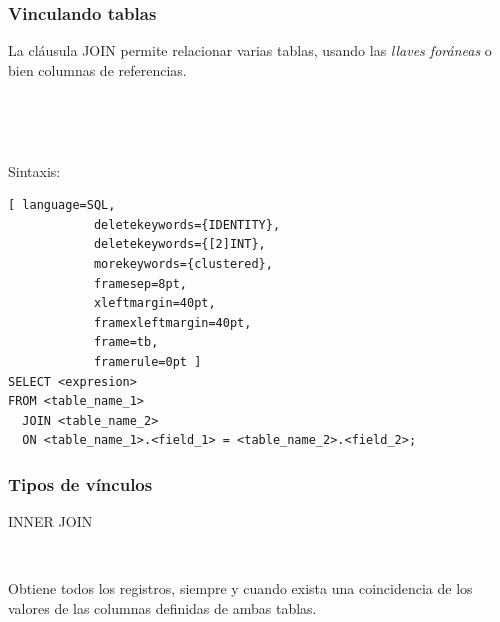 \documentclass[
	10pt, %
	aspectratio=169, %
]{beamer}
\begin{document}

\begin{frame}[fragile]
	
		\frametitle{Vinculando tablas}
		
		La cláusula \textcolor{codepurple}{JOIN} permite relacionar varias tablas, usando las \emph{llaves foráneas} o bien columnas de referencias.
		
		\ 
		
		\ 
		
		\pause
		
		Sintaxis: 
		\begin{lstlisting}[ language=SQL,
			deletekeywords={IDENTITY},
			deletekeywords={[2]INT},
			morekeywords={clustered},
			framesep=8pt,
			xleftmargin=40pt,
			framexleftmargin=40pt,
			frame=tb,
			framerule=0pt ]
SELECT <expresion>
FROM <table_name_1>
  JOIN <table_name_2>
  ON <table_name_1>.<field_1> = <table_name_2>.<field_2>;
\end{lstlisting}
		
\end{frame}


\begin{frame}[fragile]
	
	\frametitle{Tipos de vínculos}
	
	\begin{center}
		
		\textcolor{codepurple}{INNER JOIN}
		
		\ 
		
		Obtiene todos los registros, siempre y cuando exista una coincidencia de los valores de las columnas definidas de ambas tablas.
		
		\begin{venndiagram2sets}[
			labelA={ }, labelOnlyA={Tabla1}, 
			labelB={ }, labelOnlyB={Tabla2}, 
			showframe=false]
			\fillACapB
		\end{venndiagram2sets}
		
	\end{center}
	
\end{frame}

\end{document}
